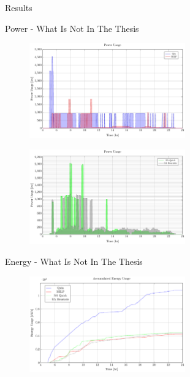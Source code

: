 \documentclass[aspectratio=169]{beamer}
\begin{document}
\begin{frame}[label={sec:org4ee59dd}]{Results}
\begin{frame}[label={sec:orgdf0d78a}]{Power - What Is Not In The Thesis}
\begin{figure}[htpb]
\centering
    \includegraphics[width=0.6\textwidth]{img/sa-pap-paper-good/power-milp-qin}
\end{figure}
\begin{figure}[htpb]
\centering
    \includegraphics[width=0.6\textwidth]{img/sa-pap-paper-good/power-sa}
\end{figure}
\end{frame}
\begin{frame}[label={sec:orgbd6db57}]{Energy - What Is Not In The Thesis}
\begin{figure}[htpb]
\centering
    \includegraphics[width=0.6\textwidth]{img/sa-pap-paper-good/energy}
\end{figure}
\end{frame}


\end{frame}
\end{document}
